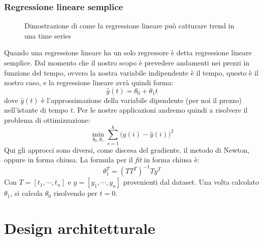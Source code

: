 \documentclass[binding=0.6cm]{sapthesis}
\begin{document}
			\subsection{Regressione lineare semplice}
				\begin{figure}[H]
				{
					\centering
					\caption{Dimostrazione di come la regressione lineare può catturare trend in una time series}
				}
				\end{figure}
				Quando una regressione lineare ha un solo regressore è detta regressione lineare semplice. Dal momento che il nostro scopo è prevedere andamenti nei prezzi in funzione del tempo, ovvero la nostra
				variabile indipendente è il tempo, questo è il nostro caso, e la regressione lineare avrà quindi forma:
				\[ \hat{y}(t) = \theta_0 + \theta_1t \]
				dove $\hat{y}(t)$ è l'approssimazione della variabile dipendente (per noi il prezzo) nell'istante di tempo $t$.
				Per le nostre applicazioni andremo quindi a risolvere il problema di ottimizzazione:
				\[
					\min_{\theta_0,\theta_1}
					\sum_{s=1}^k
					\Biggl(
						y(i) - \hat{y}(i)
					\Biggr)^2
				\]
				Qui gli approcci sono diversi, come discesa del gradiente, il metodo di Newton, oppure in forma chiusa. La formula per il \textit{fit} in forma chiusa è:
				\[
					\theta_1^T = (TT^T)^{-1}Ty^T
				\]
				Con $T = [t_1, \cdots, t_n]$ e $y = [y_1, \cdots, y_n]$ provenienti dal dataset. Una volta calcolato $\theta_1$, si calcola $\theta_0$ risolvendo per $t = 0$.
	\chapter{Design architetturale}
\end{document}
